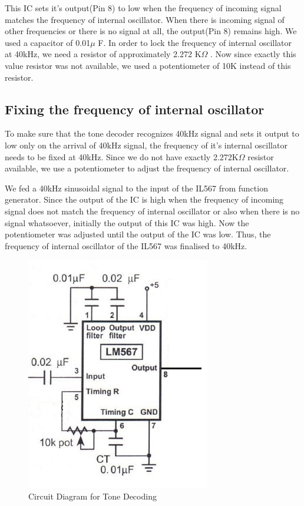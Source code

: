 This IC sets it's output(Pin 8) to low when the frequency of incoming signal matches the frequency of internal oscillator. When there is incoming signal of other frequencies or there is no signal at all, the output(Pin 8) remains high. 
We used a capacitor of 0.01$\mu$ F. In order to lock the frequency of internal oscillator at 40kHz, we need a resistor of approximately 2.272 K$\Omega$ . Now since exactly this value resistor was not available, we used a potentiometer of 10K instead of this resistor. 

\subsection{Fixing the frequency of internal oscillator}

To make sure that the tone decoder recognizes 40kHz signal and sets it output to low only on the arrival of 40kHz signal, the frequency of it's internal oscillator needs to be fixed at 40kHz. Since we do not have exactly 2.272K$\Omega$ resistor available, we use a potentiometer to adjust the frequency of internal oscillator.

We fed a 40kHz sinusoidal signal to the input of the IL567 from function generator. Since the output of the IC is high when the frequency of incoming signal does not match the frequency of internal oscillator or also when there is no signal whatsoever, initially the output of this IC was high. Now the potentiometer was adjusted until the output of the IC was low. Thus, the frequency of internal oscillator of the IL567 was finalised to 40kHz.
\begin{figure}[h]
	\centering
	\includegraphics[scale=0.7]{Images/ToneDecoder.jpg}
	\caption{Circuit Diagram for Tone Decoding}
	\label{fig:CircuitDiagramForToneDecoding}
\end{figure}

